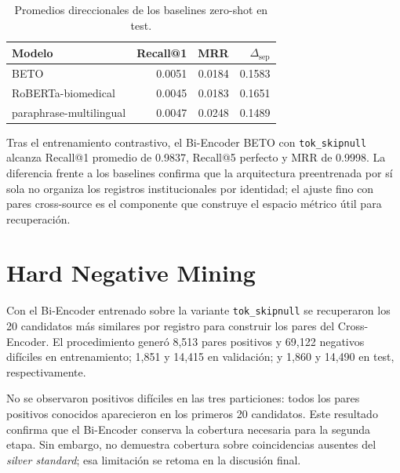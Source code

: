 \begin{table}[htbp]
    \centering
    \small
    \caption{Promedios direccionales de los baselines zero-shot en test.}
    \label{tab:zeroshot_resultados}
    \begin{tabular}{lrrr}
        \hline
        Modelo & Recall@1 & MRR & $\Delta_{\mathrm{sep}}$ \\
        \hline
        BETO & 0.0051 & 0.0184 & 0.1583 \\
        RoBERTa-biomedical & 0.0045 & 0.0183 & 0.1651 \\
        paraphrase-multilingual & 0.0047 & 0.0248 & 0.1489 \\
        \hline
    \end{tabular}
\end{table}

Tras el entrenamiento contrastivo, el Bi-Encoder BETO con \texttt{tok\_skipnull} alcanza Recall@1 promedio de 0.9837, Recall@5 perfecto y MRR de 0.9998. La diferencia frente a los baselines confirma que la arquitectura preentrenada por sí sola no organiza los registros institucionales por identidad; el ajuste fino con pares cross-source es el componente que construye el espacio métrico útil para recuperación.


\section{Hard Negative Mining}

Con el Bi-Encoder entrenado sobre la variante \texttt{tok\_skipnull} se recuperaron los 20 candidatos más similares por registro para construir los pares del Cross-Encoder. El procedimiento generó 8,513 pares positivos y 69,122 negativos difíciles en entrenamiento; 1,851 y 14,415 en validación; y 1,860 y 14,490 en test, respectivamente.

No se observaron positivos difíciles en las tres particiones: todos los pares positivos conocidos aparecieron en los primeros 20 candidatos. Este resultado confirma que el Bi-Encoder conserva la cobertura necesaria para la segunda etapa. Sin embargo, no demuestra cobertura sobre coincidencias ausentes del \textit{silver standard}; esa limitación se retoma en la discusión final.



